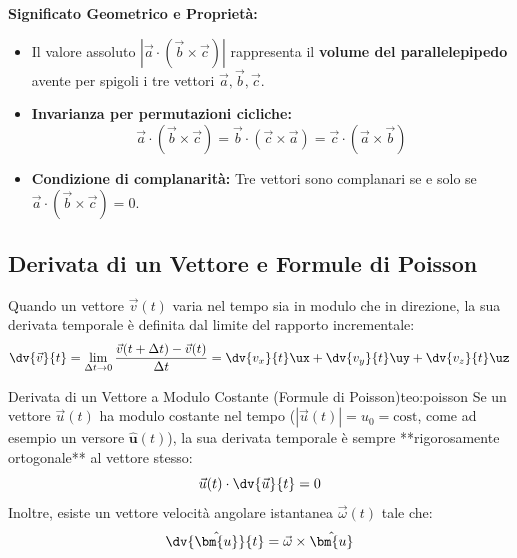 \textbf{Significato Geometrico e Proprietà:}
\begin{itemize}
    \item Il valore assoluto $|\vec{a}\cdot(\vec{b}\times\vec{c})|$ rappresenta il \textbf{volume del parallelepipedo} avente per spigoli i tre vettori $\vec{a}, \vec{b}, \vec{c}$.
    \item \textbf{Invarianza per permutazioni cicliche:}
    \begin{equation}
        \vec{a}\cdot(\vec{b}\times\vec{c}) = \vec{b}\cdot(\vec{c}\times\vec{a}) = \vec{c}\cdot(\vec{a}\times\vec{b})
    \end{equation}
    \item \textbf{Condizione di complanarità:} Tre vettori sono complanari se e solo se $\vec{a}\cdot(\vec{b}\times\vec{c}) = 0$.
\end{itemize}

\subsection{Derivata di un Vettore e Formule di Poisson}

Quando un vettore $\vec{v}(t)$ varia nel tempo sia in modulo che in direzione, la sua derivata temporale è definita dal limite del rapporto incrementale:
\begin{equation}
    \dv{\vec{v}}{t} = \lim_{\Delta t \to 0} \frac{\vec{v}(t+\Delta t) - \vec{v}(t)}{\Delta t} = \dv{v_x}{t}\ux + \dv{v_y}{t}\uy + \dv{v_z}{t}\uz
\end{equation}

\begin{teorema}{Derivata di un Vettore a Modulo Costante (Formule di Poisson)}{teo:poisson}
Se un vettore $\vec{u}(t)$ ha modulo costante nel tempo ($|\vec{u}(t)| = u_0 = \text{cost}$, come ad esempio un versore $\hat{\bm{u}}(t)$), la sua derivata temporale è sempre **rigorosamente ortogonale** al vettore stesso:
\begin{equation}
    \vec{u}(t)\cdot\dv{\vec{u}}{t} = 0
\end{equation}
Inoltre, esiste un vettore velocità angolare istantanea $\vec{\omega}(t)$ tale che:
\begin{equation}
    \dv{\hat{\bm{u}}}{t} = \vec{\omega} \times \hat{\bm{u}}
    \label{eq:poisson_versore}
\end{equation}
\end{teorema}

